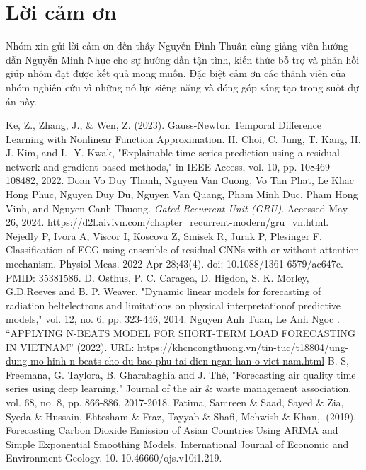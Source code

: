 \documentclass[conference]{IEEEtran}
\begin{document}
\section*{Lời cảm ơn}
Nhóm xin gửi lời cảm ơn đến thầy Nguyễn Đình Thuân cùng giảng viên hướng dẫn Nguyễn Minh Nhực cho sự hướng dẫn tận tình, kiến thức bỗ trợ và phản hồi giúp nhóm đạt được kết quả mong muốn. Đặc biệt cảm ơn các thành viên của nhóm nghiên cứu vì những nỗ lực siêng năng và đóng góp sáng tạo trong suốt dự án này.
\begin{thebibliography}{00}
     Ke, Z., Zhang, J., \& Wen, Z. (2023). Gauss-Newton Temporal Difference Learning with Nonlinear Function Approximation.
     H. Choi, C. Jung, T. Kang, H. J. Kim, and I. -Y. Kwak, "Explainable time-series prediction using a residual network and gradient-based methods," in IEEE Access, vol. 10, pp. 108469-108482, 2022.
     Doan Vo Duy Thanh, Nguyen Van Cuong, Vo Tan Phat, Le Khac Hong Phuc, Nguyen Duy Du, Nguyen Van Quang, Pham Minh Duc, Pham Hong Vinh, and Nguyen Canh Thuong. \textit{Gated Recurrent Unit (GRU)}. Accessed May 26, 2024. \url{https://d2l.aivivn.com/chapter_recurrent-modern/gru_vn.html}.
     Nejedly P, Ivora A, Viscor I, Koscova Z, Smisek R, Jurak P, Plesinger F. Classification of ECG using ensemble of residual CNNs with or without attention mechanism. Physiol Meas. 2022 Apr 28;43(4). doi: 10.1088/1361-6579/ac647c. PMID: 35381586.
     D. Osthus, P. C. Caragea, D. Higdon, S. K. Morley, G.D.Reeves and B. P. Weaver, "Dynamic linear models for forecasting of radiation beltelectrons and limitations on physical interpretationof predictive models," vol. 12, no. 6, pp. 323-446, 2014.
     Nguyen Anh Tuan, Le Anh Ngoc . “APPLYING N-BEATS MODEL FOR SHORT-TERM LOAD FORECASTING IN VIETNAM” (2022). URL: \url{https://khcncongthuong.vn/tin-tuc/t18804/ung-dung-mo-hinh-n-beats-cho-du-bao-phu-tai-dien-ngan-han-o-viet-nam.html}
     B. S, Freemana, G. Taylora, B. Gharabaghia and J. Thé, "Forecasting air quality time series using deep learning," Journal of the air \& waste management association, vol. 68, no. 8, pp. 866-886, 2017-2018.
     Fatima, Samreen \& Saad, Sayed \& Zia, Syeda \& Hussain, Ehtesham \& Fraz, Tayyab \& Shafi, Mehwish \& Khan,. (2019). Forecasting Carbon Dioxide Emission of Asian Countries Using ARIMA and Simple Exponential Smoothing Models. International Journal of Economic and Environment Geology. 10. 10.46660/ojs.v10i1.219.

\end{thebibliography}
\end{document}
